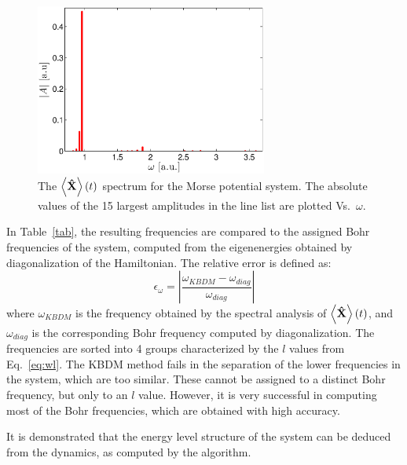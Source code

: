 \documentclass[12pt, a4paper]{article}
\begin{document}
\begin{figure}[htb]
	\centering\includegraphics[width=3in]{morse_omega}
	\caption{The $\left<\mathbf{\hat X} \right>(t)$ spectrum for the Morse potential system. The absolute values of the 15 largest amplitudes in the line list are plotted Vs.\ $\omega$.}\label{fig:spectrum}
\end{figure}

In Table~\ref{tab}, the resulting frequencies are compared to the assigned Bohr frequencies of the system, computed from the eigenenergies obtained by diagonalization of the Hamiltonian. The relative error is defined as:
\begin{equation}
	\epsilon_\omega = \left| \frac{\omega_{KBDM} - \omega_{diag}}{\omega_{diag}} \right|
\end{equation}
where $\omega_{KBDM}$ is the frequency obtained by the spectral analysis of $\left<\mathbf{\hat X} \right>(t)$, and $\omega_{diag}$ is the corresponding Bohr frequency computed by diagonalization. The frequencies are sorted into 4 groups characterized by the $l$ values from Eq.~\eqref{eq:wl}. The KBDM method fails in the separation of the lower frequencies in the system, which are too similar. These cannot be assigned to a distinct Bohr frequency, but only to an $l$ value. However, it is very successful in computing most of the Bohr frequencies, which are obtained with high accuracy.

It is demonstrated that the energy level structure of the system can be deduced from the dynamics, as computed by the algorithm. 
\end{document}
